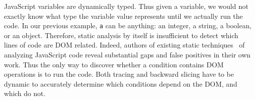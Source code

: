 JavaScript variables are dynamically typed.  Thus given a variable, we would not exactly know what type the variable value represents until we actually run the code.  
In our previous example, {\tt a} can be anything: an integer, a string, a boolean, or an object.  
Therefore, static analysis by itself is insufficient to detect which lines of code are DOM related.  
Indeed, authors of existing static techniques~\cite{staticJsWWW09, staticJsWWW11} of analyzing JavaScript code reveal substantial gaps and false positives in their own work.  
Thus the only way to discover whether a condition contains DOM operations is to run the code.  
Both tracing and backward slicing have to be dynamic to accurately determine which conditions depend on the DOM, and which do not.  



